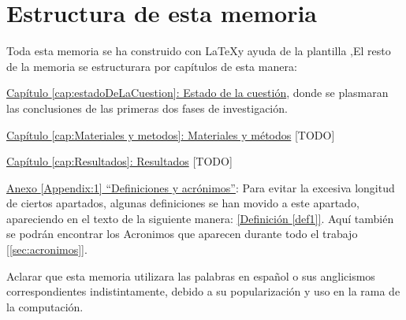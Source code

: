\section{Estructura de esta memoria}

Toda esta memoria se ha construido con \LaTeX\space [\ref{latexDef}] y ayuda de la plantilla \texis,\space El resto de la memoria se estructurara por capítulos de esta manera:

\hyperref[cap:estadoDeLaCuestion]{Capítulo \ref*{cap:estadoDeLaCuestion}: Estado de la cuestión}, donde se plasmaran las conclusiones de las primeras dos fases de investigación.

\hyperref[cap:Materiales y metodos]{Capítulo \ref*{cap:Materiales y metodos}: Materiales y métodos} [TODO]

\hyperref[cap:Resultados]{Capítulo \ref*{cap:Resultados}: Resultados}  [TODO]

\hyperref[Appendix:1]{Anexo \ref*{Appendix:1} ``Definiciones y acrónimos''}: Para evitar la excesiva longitud de ciertos apartados, algunas definiciones se han movido a este apartado, apareciendo en el texto de la siguiente manera:  \hyperref[def1]{[Definición \ref*{def1}]}. Aquí también se podrán encontrar los Acronimos que aparecen durante todo el trabajo [\ref{sec:acronimos}]. 

Aclarar que esta memoria utilizara las palabras en español o sus anglicismos correspondientes indistintamente, debido a su popularización y uso en la rama de la computación.